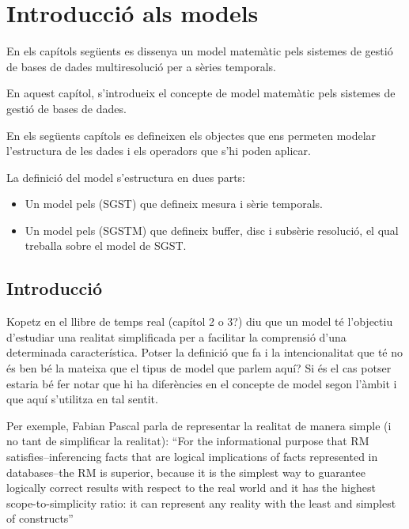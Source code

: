 \chapter{Introducció als models}


En els capítols següents es dissenya un model matemàtic pels sistemes
de gestió de bases de dades multiresolució per a sèries
temporals. 


En aquest capítol, s'introdueix el concepte de model matemàtic
pels sistemes de gestió de bases de dades.  


En els següents capítols es defineixen els objectes que ens permeten
modelar l'estructura de les dades i els operadors que s'hi poden
aplicar.

La definició del model s'estructura en dues parts:

\begin{itemize}
\item Un model pels (SGST)  que defineix mesura i sèrie temporals.
\item Un model pels (SGSTM) que defineix buffer, disc i subsèrie
  resolució, el qual treballa sobre el model de SGST.
\end{itemize}


  

\section{Introducció}


Kopetz en el llibre de temps real (capítol 2 o 3?) diu que un model té l'objectiu d'estudiar una realitat simplificada per a facilitar la comprensió d'una determinada característica. Potser la definició que fa i la intencionalitat que té no és ben bé la mateixa que el tipus de model que parlem aquí? Si és el cas potser estaria bé fer notar que hi ha diferències en el concepte de model segon l'àmbit i que aquí s'utilitza en tal sentit.

Per exemple, Fabian Pascal parla de representar la realitat de manera simple (i no tant de simplificar la realitat):
``For the informational purpose that RM satisfies--inferencing facts that are logical implications of facts represented in databases--the RM is superior, because it is the simplest way to guarantee logically correct results with respect to the real world and it has the highest scope-to-simplicity ratio: it can represent any reality with the least and simplest of constructs''




